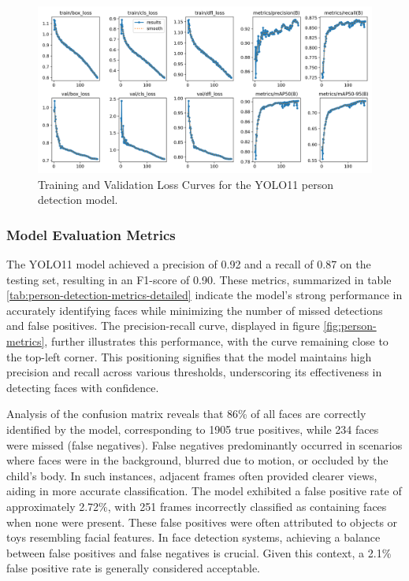 \documentclass[
  man,floatsintext]{apa6}
\begin{document}
\begin{figure}

{\centering \includegraphics[width=450px]{images/yolo_face_loss_curves} 

}

\caption{Training and Validation Loss Curves for the YOLO11 person detection model.}\label{fig:person-loss-curves}
\end{figure}

\subsubsection{Model Evaluation Metrics}\label{model-evaluation-metrics}

The YOLO11 model achieved a precision of 0.92 and a recall of 0.87 on the testing set, resulting in an F1-score of 0.90. These metrics, summarized in table \ref{tab:person-detection-metrics-detailed} indicate the model's strong performance in accurately identifying faces while minimizing the number of missed detections and false positives. The precision-recall curve, displayed in figure \ref{fig:person-metrics}, further illustrates this performance, with the curve remaining close to the top-left corner. This positioning signifies that the model maintains high precision and recall across various thresholds, underscoring its effectiveness in detecting faces with confidence.

Analysis of the confusion matrix reveals that 86\% of all faces are correctly identified by the model, corresponding to 1905 true positives, while 234 faces were missed (false negatives). False negatives predominantly occurred in scenarios where faces were in the background, blurred due to motion, or occluded by the child's body. In such instances, adjacent frames often provided clearer views, aiding in more accurate classification. The model exhibited a false positive rate of approximately 2.72\%, with 251 frames incorrectly classified as containing faces when none were present. These false positives were often attributed to objects or toys resembling facial features. In face detection systems, achieving a balance between false positives and false negatives is crucial. Given this context, a 2.1\% false positive rate is generally considered acceptable.
\end{document}
